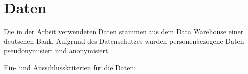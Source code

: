 \chapter{Daten}\label{ch:data}

Die in der Arbeit verwendeten Daten stammen aus dem Data Warehouse einer deutschen Bank.
Aufgrund des Datenschutzes wurden personenbezogene Daten pseudonymisiert und anonymisiert.

Ein- und Ausschlusskriterien für die Daten:
